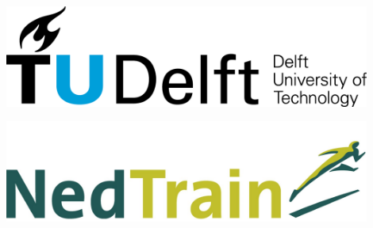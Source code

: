 \begin{titlepage}
\begin{minipage}{0.48\textwidth}
\begin{flushleft}
\includegraphics[width=0.9\textwidth]{../images/TU_Delft_logo.png}
\end{flushleft}
\end{minipage}
\begin{minipage}{0.48\textwidth}
\begin{flushright}
\includegraphics[width=0.9\textwidth]{../images/NedTrain_logo2.png}
\end{flushright}
\end{minipage}

\end{titlepage}

% 

\newpage


\newpage
\tableofcontents

\newpage

\newpage
\pagestyle{fancy}
\fancyhead[L]{}

\newpage

\newpage

\newpage

\newpage

\newpage

\newpage

\newpage

\newpage


\newpage
{}



\fancyhead{}

\newpage



